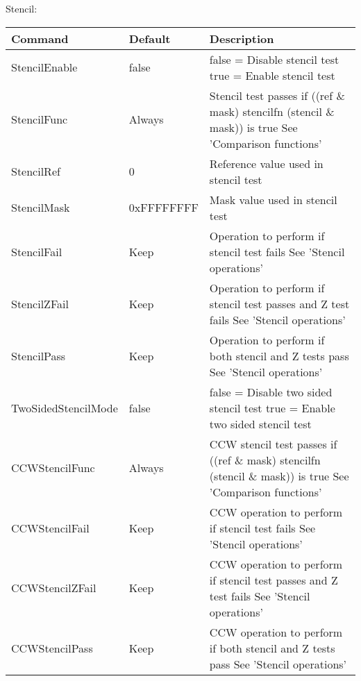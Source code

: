 Stencil:\\
\begin{tabular}{|p{4.5cm}|p{3cm}|p{9cm}|}
\hline
\textbf{Command} & \textbf{Default} & \textbf{Description}\\
\hline
StencilEnable       & false      & false = Disable stencil test\newline
                                   true  = Enable stencil test\\
\hline
StencilFunc         & Always     & Stencil test passes if ((ref \& mask) stencilfn (stencil \& mask)) is true\newline
                                   See 'Comparison functions'\\
\hline
StencilRef          & 0          & Reference value used in stencil test\\
\hline
StencilMask         & 0xFFFFFFFF & Mask value used in stencil test\\
\hline
StencilFail         & Keep       & Operation to perform if stencil test fails\newline
                                   See 'Stencil operations'\\
\hline
StencilZFail        & Keep       & Operation to perform if stencil test passes and Z test fails\newline
                                   See 'Stencil operations'\\
\hline
StencilPass         & Keep       & Operation to perform if both stencil and Z tests pass\newline
                                   See 'Stencil operations'\\
                             
\hline
TwoSidedStencilMode & false      & false = Disable two sided stencil test\newline
                                   true  = Enable two sided stencil test\\
\hline
CCWStencilFunc      & Always     & CCW stencil test passes if ((ref \& mask) stencilfn (stencil \& mask)) is true\newline
                                   See 'Comparison functions'\\
\hline
CCWStencilFail      & Keep       & CCW operation to perform if stencil test fails\newline
                                   See 'Stencil operations'\\
\hline
CCWStencilZFail     & Keep       & CCW operation to perform if stencil test passes and Z test fails\newline
                                   See 'Stencil operations'\\
\hline
CCWStencilPass      & Keep       & CCW operation to perform if both stencil and Z tests pass\newline
                                   See 'Stencil operations'\\
\hline
\end{tabular}


